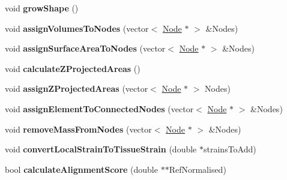 \begin{DoxyCompactItemize}
\item 
\hypertarget{classShapeBase_a92ec10be4c8ba3dd3e4b95ccd08bba7b}{}void {\bfseries grow\+Shape} ()\label{classShapeBase_a92ec10be4c8ba3dd3e4b95ccd08bba7b}

\item 
\hypertarget{classShapeBase_acee26103666067517d905b32edfbf302}{}void {\bfseries assign\+Volumes\+To\+Nodes} (vector$<$ \hyperlink{classNode}{Node} $\ast$ $>$ \&Nodes)\label{classShapeBase_acee26103666067517d905b32edfbf302}

\item 
\hypertarget{classShapeBase_a83be371f8675d04050d038e7fe1e98d5}{}void {\bfseries assign\+Surface\+Area\+To\+Nodes} (vector$<$ \hyperlink{classNode}{Node} $\ast$ $>$ \&Nodes)\label{classShapeBase_a83be371f8675d04050d038e7fe1e98d5}

\item 
\hypertarget{classShapeBase_a4bc9c0bb828f73c105321fd5a25be8cc}{}void {\bfseries calculate\+Z\+Projected\+Areas} ()\label{classShapeBase_a4bc9c0bb828f73c105321fd5a25be8cc}

\item 
\hypertarget{classShapeBase_aec0c4844fb49f5e54ab31826ecbf6e31}{}void {\bfseries assign\+Z\+Projected\+Areas} (vector$<$ \hyperlink{classNode}{Node} $\ast$ $>$ Nodes)\label{classShapeBase_aec0c4844fb49f5e54ab31826ecbf6e31}

\item 
\hypertarget{classShapeBase_a20cc141f0484b0c488619ef6727eb820}{}void {\bfseries assign\+Element\+To\+Connected\+Nodes} (vector$<$ \hyperlink{classNode}{Node} $\ast$ $>$ \&Nodes)\label{classShapeBase_a20cc141f0484b0c488619ef6727eb820}

\item 
\hypertarget{classShapeBase_a6d09a632b94b324a3bde18a43b31adb8}{}void {\bfseries remove\+Mass\+From\+Nodes} (vector$<$ \hyperlink{classNode}{Node} $\ast$ $>$ \&Nodes)\label{classShapeBase_a6d09a632b94b324a3bde18a43b31adb8}

\item 
\hypertarget{classShapeBase_ad023a96503929e72c59adb2b7ba8fcdf}{}void {\bfseries convert\+Local\+Strain\+To\+Tissue\+Strain} (double $\ast$strains\+To\+Add)\label{classShapeBase_ad023a96503929e72c59adb2b7ba8fcdf}

\item 
\hypertarget{classShapeBase_a1578faef4bfc3c8de9f8f94fd9e6b52d}{}bool {\bfseries calculate\+Alignment\+Score} (double $\ast$$\ast$Ref\+Normalised)\label{classShapeBase_a1578faef4bfc3c8de9f8f94fd9e6b52d}


\end{DoxyCompactItemize}
